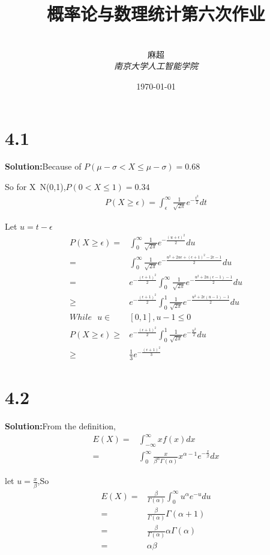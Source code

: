 \documentclass[12pt,a4paper,fontset=none]{ctexart}
\title{\textbf{概率论与数理统计第六次作业}}
\author{
\\
\Large{麻超 \quad 201300066}
\\[6pt]
{ \large \textit{南京大学人工智能学院}}\\[2pt]
}
\date{\today}
\begin{document}
\maketitle
\setcounter{page}{1}
\section*{4.1}
\textbf{Solution:}Because of $P(\mu-\sigma<X\leq \mu-\sigma)=0.68$

So for X~N(0,1),$P(0<X\leq 1)=0.34$
\begin{align*}
    P(X\geq \epsilon)=\int_{\epsilon}^{\infty}\frac{1}{\sqrt{2\pi}}e^{-\frac{t^2}{2} }dt
\end{align*}

Let $u=t-\epsilon$
\begin{align*}
    P(X\geq \epsilon)=    & \int_{0}^{\infty}\frac{1}{\sqrt{2\pi}}e^{-\frac{(u+\epsilon)^2}{2} }du
    \\=&\int_{0}^{\infty}\frac{1}{\sqrt{2\pi}}e^{-\frac{u^2+2u\epsilon+(\epsilon+1)^2-2\epsilon-1}{2} }du
    \\=&e^{-\frac{(\epsilon+1)^2}{2} }\int_{0}^{\infty}\frac{1}{\sqrt{2\pi}}e^{-\frac{u^2+2u(\epsilon-1)-1}{2} }du
    \\\geq &e^{-\frac{(\epsilon+1)^2}{2} }\int_{0}^{1}\frac{1}{\sqrt{2\pi}}e^{-\frac{u^2+2\epsilon(u-1)-1}{2} }du\\
    While\textbf{ }u\in   & [0,1],u-1\leq 0                                                                      \\
    P(X\geq \epsilon)\geq & e^{-\frac{(\epsilon+1)^2}{2} }\int_{0}^{1}\frac{1}{\sqrt{2\pi}}e^{-\frac{u^2}{2} }du \\
    \geq                  & \frac{1}{3}e^{-\frac{(\epsilon+1)^2}{3} }
\end{align*}
\section*{4.2}
\textbf{Solution:}From the definition,
\begin{align*}
    E(X)= & \int_{-\infty}^{\infty}xf(x)dx
    \\=&\int_{0}^{\infty}\frac{x}{\beta^\alpha \Gamma (\alpha)}x^{\alpha-1}e^{-\frac{x}{\beta} }dx
\end{align*}

let $u=\frac{x}{\beta} $,So
\begin{align*}
    E(X)= & \frac{\beta}{\Gamma(\alpha)}\int_{0}^{\infty}u^{\alpha}e^{-u}du
    \\=&\frac{\beta}{\Gamma(\alpha)}\Gamma(\alpha+1)
    \\=&\frac{\beta}{\Gamma(\alpha)}\alpha\Gamma(\alpha)
    \\=&\alpha\beta
\end{align*}
\end{document}
